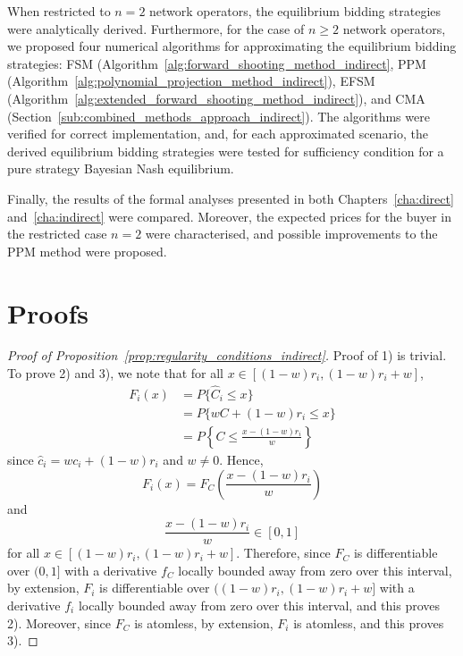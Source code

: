 When restricted to $n=2$ network operators, the equilibrium bidding strategies were analytically derived. Furthermore, for the case of $n\geq 2$ network operators, we proposed four numerical algorithms for approximating the equilibrium bidding strategies: FSM (Algorithm~\ref{alg:forward_shooting_method_indirect}, PPM (Algorithm~\ref{alg:polynomial_projection_method_indirect}), EFSM (Algorithm~\ref{alg:extended_forward_shooting_method_indirect}), and CMA (Section~\ref{sub:combined_methods_approach_indirect}). The algorithms were verified for correct implementation, and, for each approximated scenario, the derived equilibrium bidding strategies were tested for sufficiency condition for a pure strategy Bayesian Nash equilibrium.

Finally, the results of the formal analyses presented in both Chapters~\ref{cha:direct} and~\ref{cha:indirect} were compared. Moreover, the expected prices for the buyer in the restricted case $n=2$ were characterised, and possible improvements to the PPM method were proposed.

\section{Proofs}
\label{sec:proofs_indirect}
\begin{proof}[Proof of Proposition~\ref{prop:regularity_conditions_indirect}]
Proof of 1) is trivial. To prove 2) and 3), we note that for all $x\in [(1-w)r_i, (1-w)r_i + w]$,
\begin{align*}
  F_i(x)
  &= P\{\hat{C}_i\le x\} \\
  &= P\{wC + (1-w)r_i\le x\} \\
  &= P\left\{ C\le \frac{x - (1-w)r_i}{w} \right\}
\end{align*}
since $\hat{c}_i = wc_i + (1-w)r_i$ and $w\neq 0$. Hence,
\begin{equation*}
  F_i(x) = F_C\left( \frac{x - (1-w)r_i}{w} \right)
\end{equation*}
and
\begin{equation*}
  \frac{x - (1-w)r_i}{w}\in [0,1]
\end{equation*}
for all $x\in [(1-w)r_i, (1-w)r_i + w]$. Therefore, since $F_C$ is differentiable over $(0,1]$ with a derivative $f_C$ locally bounded away from zero over this interval, by extension, $F_i$ is differentiable over $((1-w)r_i, (1-w)r_i + w]$ with a derivative $f_i$ locally bounded away from zero over this interval, and this proves 2). Moreover, since $F_C$ is atomless, by extension, $F_i$ is atomless, and this proves 3).
\end{proof}

